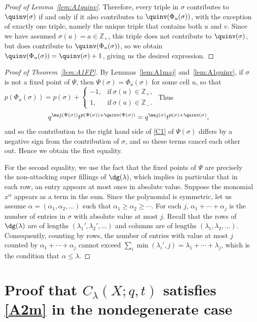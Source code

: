 \begin{proof}[Proof of Lemma~\ref{lem:A1quinv}]
Therefore, every triple in $\sigma$ contributes to $\quinv(\sigma)$ if and only if it also contributes to $\quinv(\Phi_u(\sigma))$, with the exception of exactly one triple, namely the unique triple that contains both $u$ and $v$. Since we have assumed $\sigma(u)=a\in\mathbb{Z}_+$, this triple does not contribute to $\quinv(\sigma)$, but does contribute to $\quinv(\Phi_u(\sigma))$, so we obtain $\quinv(\Phi_u(\sigma))=\quinv(\sigma)+1$, giving us the desired expression.
\end{proof}

\begin{proof}[Proof of Theorem~\ref{lem:A1FP}]
By Lemmas~\ref{lem:A1maj} and~\ref{lem:A1quinv}, if $\sigma$ is not a fixed point of $\Psi$, then $\Psi(\sigma)=\Phi_u(\sigma)$ for some cell $u$, so that $p(\Phi_u(\sigma)) = p(\sigma)+\begin{cases}-1, & \mbox{if}\ \sigma(u)\in\mathbb{Z}_+,\\1, & \mbox{if}\ \sigma(u)\in\mathbb{Z}_-.\end{cases}$ Thus 
\[
q^{\maj(\Psi(\sigma))}t^{p(\Psi(\sigma))+\quinv(\Psi(\sigma))} = q^{\maj(\sigma)}t^{p(\sigma)+\quinv(\sigma)},
\] 
and so the contribution to the right hand side of \eqref{C1} of $\Psi(\sigma)$ differs by a negative sign from the contribution of $\sigma$, and so these terms cancel each other out. Hence we obtain the first equality.

For the second equality, we use the fact that the fixed points of $\Psi$ are precisely the non-attacking super fillings of $\dg(\lambda)$, which implies in particular that in each row, an entry appears at most once in absolute value. Suppose the monomial $x^{\alpha}$ appears as a term in the sum. Since the polynomial is symmetric, let us assume $\alpha=(\alpha_1,\alpha_2,\ldots)$ such that $\alpha_1\geq \alpha_2 \geq \cdots$. For each $j$, $\alpha_1+\cdots+\alpha_j$ is the number of entries in $\sigma$ with absolute value at most $j$. Recall that the rows of $\dg(\lambda)$ are of lengths $(\lambda_1',\lambda_2',\ldots)$ and columns are of lengths $(\lambda_1,\lambda_2,\ldots)$. Consequently, counting by rows, the number of entries with value at most $j$ counted by $\alpha_1+\cdots+\alpha_j$ cannot exceed $\sum_i \min(\lambda_i',j) = \lambda_1+\cdots+\lambda_j$, which is the condition that $\alpha \leq \lambda$. 
\end{proof}

\section{Proof that $C_{\lambda}(X;q,t)$ satisfies \eqref{A2m} in the nondegenerate case}
\label{sec:A2m}

